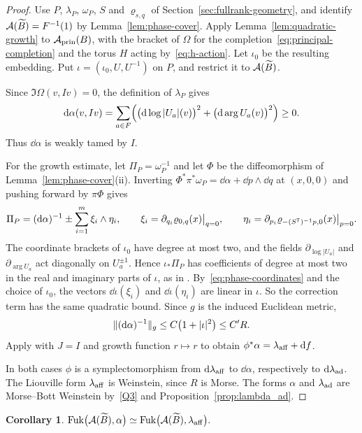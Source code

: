 \documentclass[12pt, letter]{amsart}
\DeclareMathOperator{\Fuk}{Fuk}
\newtheorem{corollary}[dummy]{Corollary}
\theoremstyle{definition}
\begin{document}
\begin{proof}
Use $P$, $\lambda_P$, $\omega_P$, $S$ and $\varrho_{s,q}$ of Section~\ref{sec:fullrank-geometry}, and identify $\mathcal{A}(\widetilde B)=F^{-1}(1)$ by Lemma~\ref{lem:phase-cover}.
Apply Lemma~\ref{lem:quadratic-growth} to $\mathcal{A}_{\mathrm{prin}}(B)$, with the bracket of $\Omega$ for the completion~\eqref{eq:principal-completion} and the torus $H$ acting by~\eqref{eq:h-action}.
Let $\iota_0$ be the resulting embedding.
Put $\iota=(\iota_0,U,U^{-1})$ on $P$, and restrict it to $\mathcal{A}(\widetilde B)$.

Since $\Im\Omega(v,Iv)=0$, the definition of $\lambda_P$ gives 
\[
 \mathrm{d}\alpha(v,Iv)=\sum_{a\in F}\Bigl(\bigl(\mathrm{d}\log|U_a|(v)\bigr)^2+\bigl(\mathrm{d}\arg U_a(v)\bigr)^2\Bigr)\ge0 .
\]
Thus $\dd\alpha$ is weakly tamed by $I$.

For the growth estimate, let $\Pi_P=\omega_P^{-1}$ and let $\Phi$ be the diffeomorphism of Lemma~\ref{lem:phase-cover}(ii).
Inverting $\Phi^*\pi^*\omega_P=\dd\alpha+\dd p\wedge\dd q$ at $(x,0,0)$ and pushing forward by $\pi\Phi$ gives
\[
 \Pi_P=(\mathrm{d}\alpha)^{-1}\pm\sum_{i=1}^m\xi_i\wedge\eta_i,\qquad
 \xi_i=\partial_{q_i}\varrho_{0,q}(x)\big|_{q=0},\qquad
 \eta_i=\partial_{p_i}\varrho_{-(S^{\mathsf T})^{-1}p,0}(x)\big|_{p=0}.
\]
The coordinate brackets of $\iota_0$ have degree at most two, and the fields $\partial_{\log|U_a|}$ and $\partial_{\arg U_a}$ act diagonally on $U_a^{\pm1}$.
Hence $\iota_*\Pi_P$ has coefficients of degree at most two in the real and imaginary parts of $\iota$, as in \cite[proof of Corollary~1.6]{HS26}.
By~\eqref{eq:phase-coordinates} and the choice of $\iota_0$, the vectors $\dd\iota(\xi_i)$ and $\dd\iota(\eta_i)$ are linear in $\iota$.
So the correction term has the same quadratic bound.
Since $g$ is the induced Euclidean metric,
\[
 \lVert (\mathrm{d}\alpha)^{-1}\rVert_g\le C\bigl(1+\lvert \iota\rvert^2\bigr)\le C'R .
\]
Apply \cite[Theorem~1.4]{HS26} with $J=I$ and growth function $r\mapsto r$ to obtain $\phi^*\alpha=\lambda_{\mathrm{aff}}+\mathrm{d} f$.

In both cases $\phi$ is a symplectomorphism from $\mathrm{d}\lambda_{\mathrm{aff}}$ to $\dd\alpha$, respectively to $\mathrm{d}\lambda_{\mathrm{ad}}$.
The Liouville form $\lambda_{\mathrm{aff}}$ is Weinstein, since $R$ is Morse.
The forms $\alpha$ and $\lambda_{\mathrm{ad}}$ are Morse--Bott Weinstein by~\ref{Q3} and Proposition~\ref{prop:lambda_ad}.
\end{proof}
\begin{corollary}
$\Fuk\bigl(\cA(\widetilde B),\alpha\bigr)\simeq\Fuk\bigl(\cA(\widetilde B),\laff\bigr).$
\end{corollary}
\end{document}

